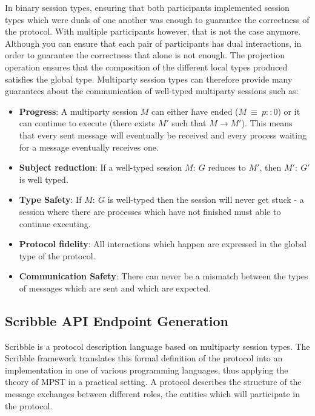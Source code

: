 \documentclass[12pt,twoside]{report}
\begin{document}
In binary session types, ensuring that both participants implemented session types which were duals of one another was enough to guarantee the correctness of the protocol. With multiple participants however, that is not the case anymore. Although you can ensure that each pair of participants has dual interactions, in order to guarantee the correctness that alone is not enough. The projection operation ensures that the composition of the different local types produced satisfies the global type. Multiparty session types can therefore provide many guarantees about the communication of well-typed multiparty sessions such as:
\begin{itemize}
    \item \textbf{Progress}: A multiparty session $M$ can either have ended ($M\ \equiv\ p :: 0$) or it can continue to execute (there exists $M'$ such that $M \longrightarrow M'$). This means that every sent message will eventually be received and every process waiting for a message eventually receives one. \cite{verygentleintrotompst, gentleintrotompst}
    \item \textbf{Subject reduction}: If a well-typed session $M:\ G$ reduces to $M'$, then $M':\ G'$ is well typed\cite{verygentleintrotompst}.
    \item \textbf{Type Safety}: If $M:\ G$ is well-typed then the session will never get stuck - a session where there are processes which have not finished must able to continue executing\cite{verygentleintrotompst}.
    \item \textbf{Protocol fidelity}: All interactions which happen are expressed in the global type of the protocol\cite{gentleintrotompst}.
    \item \textbf{Communication Safety}: There can never be a mismatch between the types of messages which are sent and which are expected\cite{gentleintrotompst}.
\end{itemize}{}

\subsection{Scribble API Endpoint Generation}\label{Scribble}
Scribble\cite{scribble,featherweight} is a protocol description language based on multiparty session types. The Scribble framework translates this formal definition of the protocol into an implementation in one of various programming languages, thus applying the theory of MPST in a practical setting. A protocol describes the structure of the message exchanges between different roles, the entities which will participate in the protocol.\\
\end{document}
